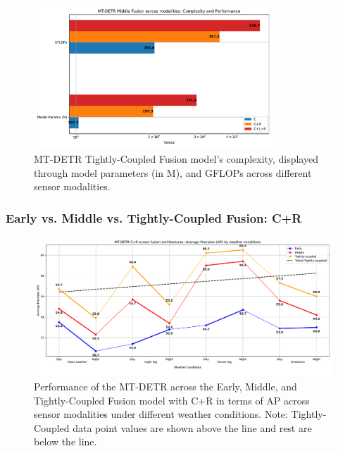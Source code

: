 \documentclass[report.tex]{subfiles}
\begin{document}
    \begin{figure}[h!]
        \centering
        \includegraphics[width=0.8\textwidth]{images/results/mtdetr/tight/model_complexity.pdf}
        \caption{MT-DETR Tightly-Coupled Fusion model's complexity, displayed through model parameters (in M), and GFLOPs across different sensor modalities.}
        \label{fig:mtdetr_tight_model_complexity}
    \end{figure}


    

    \FloatBarrier
    \subsubsection{Early vs. Middle vs. Tightly-Coupled Fusion: C+R}

    \begin{figure}[h!]
        \centering
        \includegraphics[width=1.0\textwidth]{images/results/mtdetr/EMT_CR/ap.pdf}
        \caption{Performance of the MT-DETR across the Early, Middle, and Tightly-Coupled Fusion model with C+R in terms of AP across sensor modalities under different weather conditions. Note: Tightly-Coupled data point values are shown above the line and rest are below the line.}
        \label{fig:mtdetr_emt_cr_ap}
    \end{figure}
\end{document}
